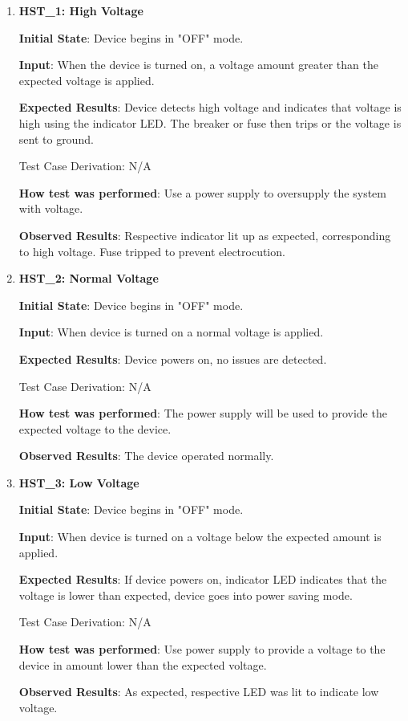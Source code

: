 \documentclass[12pt, titlepage]{article}
\begin{document}
\begin{enumerate}

  \item{\textbf{HST\_1: High Voltage}}\label{HST1}

  \textbf{Initial State}: Device begins in "OFF" mode.

  \textbf{Input}: When the device is turned on, a voltage amount greater than the expected voltage is applied.

  \textbf{Expected Results}: Device detects high voltage and indicates that voltage is high using the indicator LED. The breaker or fuse then trips or the voltage is sent to ground.

  Test Case Derivation: N/A

  \textbf{How test was performed}: Use a power supply to oversupply the system with voltage.

  \textbf{Observed Results}: Respective indicator lit up as expected, corresponding to high voltage. Fuse tripped to prevent electrocution.

  \item{\textbf{HST\_2: Normal Voltage}}\label{HST2}

  \textbf{Initial State}: Device begins in "OFF" mode.

  \textbf{Input}: When device is turned on a normal voltage is applied.

  \textbf{Expected Results}: Device powers on, no issues are detected.

  Test Case Derivation: N/A

  \textbf{How test was performed}: The power supply will be used to provide the expected voltage to the device.

  \textbf{Observed Results}: The device operated normally.

  \item{\textbf{HST\_3: Low Voltage}}\label{HST3}

  \textbf{Initial State}: Device begins in "OFF" mode.

  \textbf{Input}: When device is turned on a voltage below the expected amount is applied.

  \textbf{Expected Results}: If device powers on, indicator LED indicates that the voltage is lower than expected, device goes into power saving mode.

  Test Case Derivation: N/A

  \textbf{How test was performed}: Use power supply to provide a voltage to the device in amount lower than the expected voltage.

  \textbf{Observed Results}: As expected, respective LED was lit to indicate low voltage.

\end{enumerate}
\end{document}

